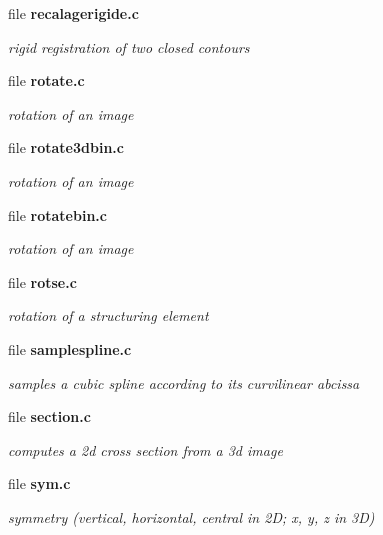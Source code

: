 \begin{CompactItemize}
\item 
file {\bf recalagerigide.c}
\begin{CompactList}\small\item\em rigid registration of two closed contours \item\end{CompactList}

\item 
file {\bf rotate.c}
\begin{CompactList}\small\item\em rotation of an image \item\end{CompactList}

\item 
file {\bf rotate3dbin.c}
\begin{CompactList}\small\item\em rotation of an image \item\end{CompactList}

\item 
file {\bf rotatebin.c}
\begin{CompactList}\small\item\em rotation of an image \item\end{CompactList}

\item 
file {\bf rotse.c}
\begin{CompactList}\small\item\em rotation of a structuring element \item\end{CompactList}

\item 
file {\bf samplespline.c}
\begin{CompactList}\small\item\em samples a cubic spline according to its curvilinear abcissa \item\end{CompactList}

\item 
file {\bf section.c}
\begin{CompactList}\small\item\em computes a 2d cross section from a 3d image \item\end{CompactList}

\item 
file {\bf sym.c}
\begin{CompactList}\small\item\em symmetry (vertical, horizontal, central in 2D; x, y, z in 3D) \item\end{CompactList}


\end{CompactItemize}
